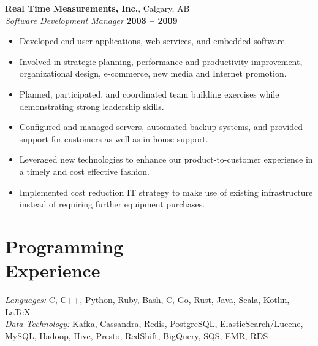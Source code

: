 \documentclass[margin,line]{resume}
\begin{document}
\begin{resume}
    \pagebreak

    \textbf{Real Time Measurements, Inc.}, Calgary, AB \vspace{2mm}\\\vspace{1mm}%
    \textsl{Software Development Manager} \hfill \textbf{2003 -- 2009}\\

    \begin{itemize}
    \item Developed end user applications, web services, and embedded software.
    \item Involved in strategic planning, performance and productivity improvement, organizational design, e-commerce, new media and Internet promotion.
    \item Planned, participated, and coordinated team building exercises while demonstrating strong leadership skills.
    \item Configured and managed servers, automated backup systems, and provided support for customers as well as in-house support.
    \item Leveraged new technologies to enhance our product-to-customer experience in a timely and cost effective fashion.
    \item Implemented cost reduction IT strategy to make use of existing infrastructure instead of requiring further equipment purchases.
    \end{itemize}

    \section{\mysidestyle Programming\\Experience}

    \emph{Languages:} C, C++, Python, Ruby, Bash, C, Go, Rust, Java, Scala, Kotlin, \LaTeX \\
    \emph{Data Technology:} Kafka, Cassandra, Redis, PostgreSQL, ElasticSearch/Lucene,
     MySQL, Hadoop, Hive, Presto, RedShift, BigQuery, SQS, EMR, RDS

\end{resume}
\end{document}
